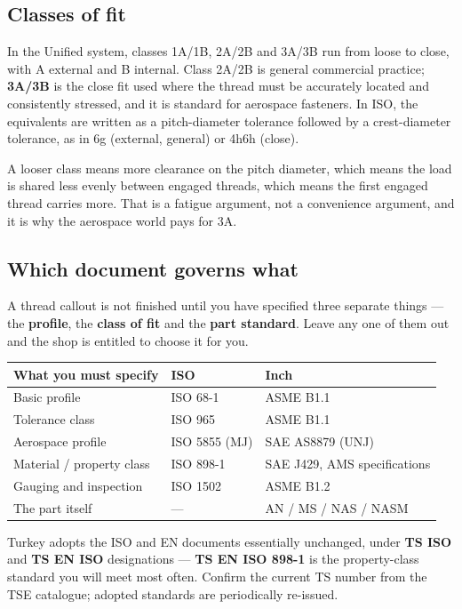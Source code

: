 \documentclass[11pt,a4paper]{article}
\begin{document}
\subsection{Classes of fit}

In the Unified system, classes 1A/1B, 2A/2B and 3A/3B run from loose to close, with A external and
B internal. Class 2A/2B is general commercial practice; \textbf{3A/3B} is the close fit used where the
thread must be accurately located and consistently stressed, and it is standard for aerospace
fasteners. In ISO, the equivalents are written as a pitch-diameter tolerance followed by a
crest-diameter tolerance, as in 6g (external, general) or 4h6h (close).

\medskip
A looser class means more clearance on the pitch diameter, which means the load is shared less evenly
between engaged threads, which means the first engaged thread carries more. That is a fatigue
argument, not a convenience argument, and it is why the aerospace world pays for 3A.

\subsection{Which document governs what}

A thread callout is not finished until you have specified three separate things --- the
\textbf{profile}, the \textbf{class of fit} and the \textbf{part standard}. Leave any one of them out
and the shop is entitled to choose it for you.

\begin{center}\small
\begin{tabular}{@{}lll@{}}
\toprule
\textbf{What you must specify} & \textbf{ISO} & \textbf{Inch}\\
\midrule
Basic profile & ISO 68-1 & ASME B1.1\\
Tolerance class & ISO 965 & ASME B1.1\\
Aerospace profile & ISO 5855 (MJ) & SAE AS8879 (UNJ)\\
Material / property class & ISO 898-1 & SAE J429, AMS specifications\\
Gauging and inspection & ISO 1502 & ASME B1.2\\
The part itself & --- & AN / MS / NAS / NASM\\
\bottomrule
\end{tabular}
\end{center}

\medskip
Turkey adopts the ISO and EN documents essentially unchanged, under \textbf{TS ISO} and \textbf{TS EN
ISO} designations --- \textbf{TS EN ISO 898-1} is the property-class standard you will meet most
often. Confirm the current TS number from the TSE catalogue; adopted standards are periodically
re-issued.
\end{document}
